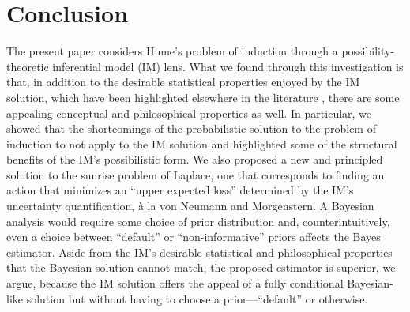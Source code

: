 \documentclass[a4paper, 12pt]{article}
\theoremstyle{plain}
\theoremstyle{definition}
\theoremstyle{remark}
\begin{document}
\section{Conclusion}
\label{S:discuss}

The present paper considers Hume's problem of induction through a possibility-theoretic inferential model (IM) lens.  What we found through this investigation is that, in addition to the desirable statistical properties enjoyed by the IM solution, which have been highlighted elsewhere in the literature \citep[e.g.,][]{imreview}, there are some appealing conceptual and philosophical properties as well.  In particular, we showed that the shortcomings of the probabilistic solution to the problem of induction to not apply to the IM solution and highlighted some of the structural benefits of the IM's possibilistic form.  We also proposed a new and principled solution to the sunrise problem of Laplace, one that corresponds to finding an action that minimizes an ``upper expected loss'' determined by the IM's uncertainty quantification, \`a la von Neumann and Morgenstern.  A Bayesian analysis would require some choice of prior distribution and, counterintuitively, even a choice between ``default'' or ``non-informative'' priors affects the Bayes estimator.  Aside from the IM's desirable statistical and philosophical properties that the Bayesian solution cannot match, the proposed estimator is superior, we argue, because the IM solution offers the appeal of a fully conditional Bayesian-like solution but without having to choose a prior---``default'' or otherwise. 
\end{document}

